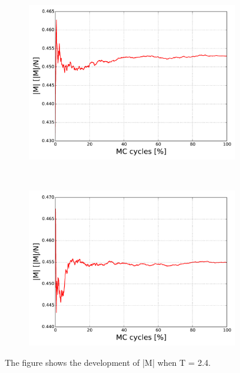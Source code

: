 \begin{figure}[H]
    \centering
    \begin{subfigure}{0.5\textwidth}
        \centering
        \includegraphics[width=\linewidth]{result/bilder/20x20/M-N20-T24}
        \caption{}
    \end{subfigure}%
    ~ 
    \begin{subfigure}{0.5\textwidth}
        \centering
        \includegraphics[width=\linewidth]{result/bilder/20x20/M-N20-T24-RNG}
        \caption{}
    \end{subfigure}
    \caption{The figure shows the development of |M| when T = 2.4. }
    \label{fig:}
\end{figure}


